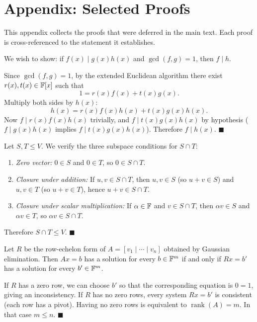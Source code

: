 \newpage
\section*{Appendix: Selected Proofs}

This appendix collects the proofs that were deferred in the main text.
Each proof is cross-referenced to the statement it establishes.

\begin{proofbox}
We wish to show: if $f(x)\mid g(x)h(x)$ and $\gcd(f,g)=1$, then $f\mid h$.

Since $\gcd(f,g)=1$, by the extended Euclidean algorithm there exist
$r(x),t(x)\in\mathbb{F}[x]$ such that
\[
    1 = r(x)f(x) + t(x)g(x).
\]
Multiply both sides by $h(x)$:
\[
    h(x) = r(x)f(x)h(x) + t(x)g(x)h(x).
\]
Now $f\mid r(x)f(x)h(x)$ trivially, and $f\mid t(x)g(x)h(x)$ by
hypothesis ($f\mid g(x)h(x)$ implies $f\mid t(x)g(x)h(x)$).
Therefore $f\mid h(x)$. \hfill$\blacksquare$
\end{proofbox}

\begin{proofbox}
Let $S,T\le V$.  We verify the three subspace conditions for $S\cap T$:
\begin{enumerate}[label=\textbf{(\roman*)}]
    \item \emph{Zero vector:} $0\in S$ and $0\in T$, so $0\in S\cap T$.
    \item \emph{Closure under addition:} If $u,v\in S\cap T$, then
          $u,v\in S$ (so $u+v\in S$) and $u,v\in T$ (so $u+v\in T$),
          hence $u+v\in S\cap T$.
    \item \emph{Closure under scalar multiplication:} If $\alpha\in\mathbb{F}$
          and $v\in S\cap T$, then $\alpha v\in S$ and $\alpha v\in T$,
          so $\alpha v\in S\cap T$.
\end{enumerate}
Therefore $S\cap T\le V$. \hfill$\blacksquare$
\end{proofbox}

\begin{proofbox}
Let $R$ be the row-echelon form of $A=[v_1\mid\cdots\mid v_n]$ obtained
by Gaussian elimination.  Then $Ax=b$ has a solution for every $b\in\mathbb{F}^m$
if and only if $Rx=b'$ has a solution for every $b'\in\mathbb{F}^m$.

If $R$ has a zero row, we can choose $b'$ so that the corresponding
equation is $0=1$, giving an inconsistency.  If $R$ has no zero rows,
every system $Rx=b'$ is consistent (each row has a pivot).  Having no zero
rows is equivalent to $\operatorname{rank}(A)=m$.  In that case $m\le n$.
\hfill$\blacksquare$
\end{proofbox}

